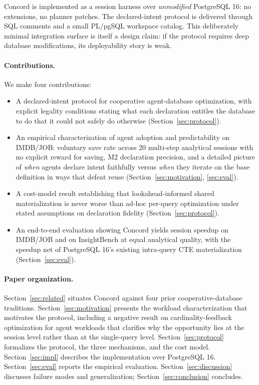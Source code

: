 Concord is implemented as a session harness over \emph{unmodified} PostgreSQL 16: no extensions, no planner patches. The declared-intent protocol is delivered through SQL comments and a small PL/pgSQL workspace catalog. This deliberately minimal integration surface is itself a design claim: if the protocol requires deep database modifications, its deployability story is weak.

\paragraph{Contributions.}
We make four contributions:

\begin{itemize}
\item A declared-intent protocol for cooperative agent-database optimization, with explicit legality conditions stating what each declaration entitles the database to do that it could not safely do otherwise (Section~\ref{sec:protocol}).

\item An empirical characterization of agent adoption and predictability on IMDB/JOB: \adoptionRate voluntary save rate across 20 multi-step analytical sessions with no explicit reward for saving, \mTwoPrecision M2 declaration precision, and a detailed picture of \emph{when} agents declare intent faithfully versus \emph{when} they iterate on the base definition in ways that defeat reuse (Section~\ref{sec:motivation}, \ref{sec:eval}).

\item A cost-model result establishing that lookahead-informed shared materialization is never worse than ad-hoc per-query optimization under stated assumptions on declaration fidelity (Section~\ref{sec:protocol}).

\item An end-to-end evaluation showing Concord yields \imdbSpeedupFull session speedup on IMDB/JOB and \ibSpeedup on InsightBench at equal analytical quality, with the speedup net of PostgreSQL 16's existing intra-query CTE materialization (Section~\ref{sec:eval}).
\end{itemize}

\paragraph{Paper organization.}
Section~\ref{sec:related} situates Concord against four prior cooperative-database traditions. Section~\ref{sec:motivation} presents the workload characterization that motivates the protocol, including a negative result on cardinality-feedback optimization for agent workloads that clarifies why the opportunity lies at the session level rather than at the single-query level. Section~\ref{sec:protocol} formalizes the protocol, the three mechanisms, and the cost model. Section~\ref{sec:impl} describes the implementation over PostgreSQL 16. Section~\ref{sec:eval} reports the empirical evaluation. Section~\ref{sec:discussion} discusses failure modes and generalization; Section~\ref{sec:conclusion} concludes.
